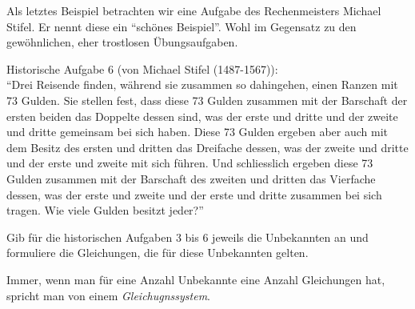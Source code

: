 \documentclass[11pt,oneside]{article}
\begin{document}
Als letztes Beispiel betrachten wir eine Aufgabe des Rechenmeisters Michael Stifel. Er nennt diese ein "`schönes Beispiel"'. Wohl im Gegensatz zu den gewöhnlichen, eher trostlosen Übungsaufgaben.
\begin{center}
	\begin{framed}
		Historische Aufgabe 6 (von Michael Stifel (1487-1567)):\\

		"`Drei Reisende finden, während sie zusammen so dahingehen, einen Ranzen mit 73 Gulden. Sie stellen fest, dass diese 73 Gulden zusammen mit der Barschaft der ersten beiden das Doppelte dessen sind, was der erste und dritte und der zweite und dritte gemeinsam bei sich haben. Diese 73 Gulden ergeben aber auch mit dem Besitz des ersten und dritten das Dreifache dessen, was der zweite und dritte und der erste und zweite mit sich führen. Und schliesslich ergeben diese 73 Gulden zusammen mit der Barschaft des zweiten und
		dritten das Vierfache dessen, was der erste und zweite und der erste
		und dritte zusammen bei sich tragen. Wie viele Gulden besitzt jeder?"'
	\end{framed}
\end{center}
\begin{aufgabe}
	Gib für die historischen Aufgaben 3 bis 6 jeweils die Unbekannten an und formuliere die Gleichungen, die für diese Unbekannten gelten.
\end{aufgabe}

\begin{definition}[Gleichungssystem]
	Immer, wenn man für eine Anzahl Unbekannte eine Anzahl Gleichungen hat, spricht man von einem \emph{Gleichugnssystem}.
\end{definition}
\newpage
\end{document}

